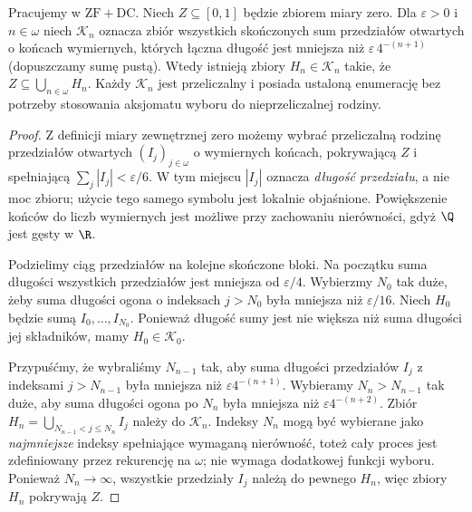 \begin{lemat}
\label{lem:ad-null-cover-coding}
Pracujemy w $\mathrm{ZF}+\mathrm{DC}$.
Niech $Z\subseteq[0,1]$ będzie zbiorem miary zero.
Dla $\varepsilon>0$ i $n\in\omega$ niech
$\mathcal K_n$ oznacza zbiór wszystkich skończonych
sum przedziałów otwartych o końcach wymiernych,
których łączna długość jest mniejsza niż
$\varepsilon\,4^{-(n+1)}$ (dopuszczamy sumę pustą).
Wtedy istnieją zbiory $H_n\in\mathcal K_n$ takie, że
$Z\subseteq\bigcup_{n\in\omega}H_n$.
Każdy $\mathcal K_n$ jest przeliczalny i posiada
ustaloną enumerację bez potrzeby stosowania
aksjomatu wyboru do nieprzeliczalnej rodziny.
\end{lemat}
\begin{proof}
Z definicji miary zewnętrznej zero możemy wybrać
przeliczalną rodzinę przedziałów otwartych
$(I_j)_{j\in\omega}$ o wymiernych końcach,
pokrywającą $Z$ i spełniającą
$\sum_j |I_j|<\varepsilon/6$.
W tym miejscu $|I_j|$ oznacza \emph{długość przedziału},
a nie moc zbioru; użycie tego samego symbolu
jest lokalnie objaśnione. Powiększenie końców do
liczb wymiernych jest możliwe przy zachowaniu
nierówności, gdyż $\Q$ jest gęsty w $\R$.

Podzielimy ciąg przedziałów na kolejne skończone
bloki. Na początku suma długości wszystkich
przedziałów jest mniejsza od $\varepsilon/4$.
Wybierzmy $N_0$ tak duże, żeby suma długości
ogona o indeksach $j>N_0$ była mniejsza niż
$\varepsilon/16$. Niech $H_0$ będzie sumą
$I_0,\dots,I_{N_0}$. Ponieważ długość sumy
jest nie większa niż suma długości jej składników,
mamy $H_0\in\mathcal K_0$.

Przypuśćmy, że wybraliśmy $N_{n-1}$ tak, aby
suma długości przedziałów $I_j$ z indeksami
$j>N_{n-1}$ była mniejsza niż
$\varepsilon 4^{-(n+1)}$.
Wybieramy $N_n>N_{n-1}$ tak duże, aby
suma długości ogona po $N_n$ była mniejsza niż
$\varepsilon 4^{-(n+2)}$.
Zbiór $H_n=\bigcup_{N_{n-1}<j\le N_n}I_j$
należy do $\mathcal K_n$. Indeksy $N_n$ mogą być
wybierane jako \emph{najmniejsze} indeksy
spełniające wymaganą nierówność, toteż cały
proces jest zdefiniowany przez rekurencję na
$\omega$; nie wymaga dodatkowej funkcji wyboru.
Ponieważ $N_n\to\infty$, wszystkie przedziały
$I_j$ należą do pewnego $H_n$, więc zbiory
$H_n$ pokrywają $Z$.
\end{proof}

